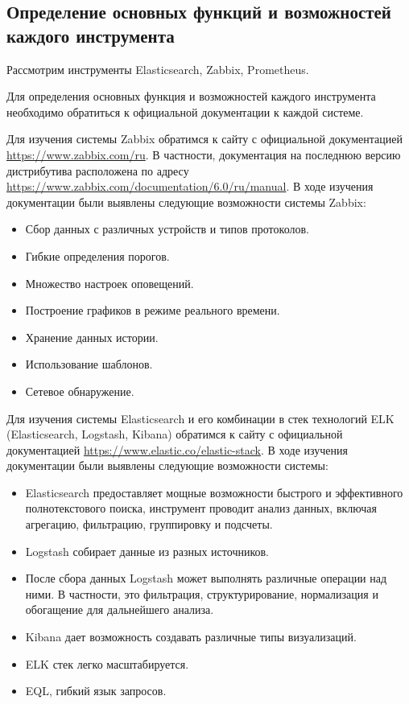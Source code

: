 \subsection{Определение основных функций и возможностей каждого инструмента}

Рассмотрим инструменты Elasticsearch, Zabbix, Prometheus.

Для определения основных функция и возможностей каждого инструмента необходимо обратиться
к официальной документации к каждой системе. 

Для изучения системы Zabbix обратимся к сайту с официальной документацией \href{https://www.zabbix.com/ru}{https://www.zabbix.com/ru}.
В частности, документация на последнюю версию дистрибутива расположена по адресу
 \href{https://www.zabbix.com/documentation/6.0/ru/manual}{https://www.zabbix.com/documentation/6.0/ru/manual}.
В ходе изучения документации были выявлены следующие возможности системы Zabbix:
\begin{itemize}
    \item Сбор данных с различных устройств и типов протоколов.
    \item Гибкие определения порогов.
    \item Множество настроек оповещений.
    \item Построение графиков в режиме реального времени.
    \item Хранение данных истории.
    \item Использование шаблонов.
    \item Сетевое обнаружение.
\end{itemize}


Для изучения системы Elasticsearch и его комбинации в стек технологий ELK (Elasticsearch, Logstash, Kibana) обратимся к сайту с официальной документацией
\href{https://www.elastic.co/elastic-stack}{https://www.elastic.co/elastic-stack}.
В ходе изучения документации были выявлены следующие возможности системы:
\begin{itemize}
    \item Elasticsearch предоставляет мощные возможности быстрого и эффективного полнотекстового поиска, инструмент проводит анализ данных, включая агрегацию, фильтрацию, группировку и подсчеты.
    \item Logstash собирает данные из разных источников.
    \item После сбора данных Logstash может выполнять различные операции над ними. В частности, это фильтрация, структурирование, нормализация и обогащение для дальнейшего анализа.
    \item Kibana дает возможность создавать различные типы визуализаций.
    \item ELK стек легко масштабируется.
    \item EQL, гибкий язык запросов.
\end{itemize}



